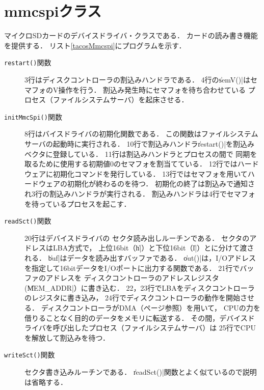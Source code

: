 \section{mmcspiクラス}
\label{tacosLbaDriver}
マイクロSDカードのデバイスドライバ・クラスである．
カードの読み書き機能を提供する．
リスト\ref{tacosMmcspi}にプログラムを示す．

  

\begin{description}
\item[\texttt{restart()}関数]
  3行はディスクコントローラの割込みハンドラである．
  4行の\|semV()|はセマフォのV操作を行う．
  割込み発生時にセマフォを待ち合わせている
  プロセス（ファイルシステムサーバ）を起床させる．
\item[\texttt{initMmcSpi()}関数]
  8行はバイスドライバの初期化関数である．
  この関数はファイルシステムサーバの起動時に実行される．
  10行で割込みハンドラ\|restart()|を割込みベクタに登録している．
  11行は割込みハンドラとプロセスの間で
  同期を取るために使用する初期値0のセマフォを割当てている．
  12行ではハードウェアに初期化コマンドを発行している．
  13行ではセマフォを用いてハードウェアの初期化が終わるのを待つ．
  初期化の終了は割込みで通知され3行の割込みハンドラが実行される．
  割込みハンドラは4行でセマフォを待っているプロセスを起こす．
\item[\texttt{readSct()}関数]
  20行はデバイスドライバの
  セクタ読み出しルーチンである．
  セクタのアドレスはLBA方式で，
  上位16bit（\|h|）と下位16bit（\|l|）とに分けて渡される．
  \|buf|はデータを読み出すバッファである．
  \|out()|は，I/Oアドレスを指定して16bitデータをI/Oポートに出力する関数である．
  21行でバッファのアドレスを
  ディスクコントローラのアドレスレジスタ(\|MEM_ADDR|）に書き込む．
  22，23行でLBAをディスクコントローラのレジスタに書き込み，
  24行でディスクコントローラの動作を開始させる．
  ディスクコントローラがDMA（\pageref{dma}ページ参照）を用いて，
  CPUの力を借りることなく目的のデータをメモリに転送する．
  その間，デバイスドライバを呼び出したプロセス（ファイルシステムサーバ）は
  25行でCPUを解放して割込みを待つ．
\item[\texttt{writeSct()}関数]
  セクタ書き込みルーチンである．
  \|readSct()|関数とよく似ているので説明は省略する．
\end{description}


